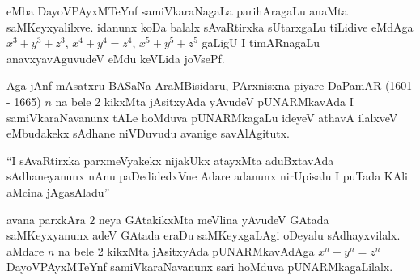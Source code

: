 eMba DayoVPAyxMTeYnf samiVkaraNagaLa parihAragaLu anaMta saMKeyxyalilxve. idanunx koDa balalx sAvaRtirxka sUtarxgaLu tiLidive eMdAga $x^3+y^3+z^3$, \quad $x^4+y^4=z^4$, \quad $x^5+y^5+z^5$ \quad gaLigU I timARnagaLu anavxyavAguvudeV eMdu keVLida joVsePf.

Aga jAnf mAsatxru BASaNa AraMBisidaru, PArxnisxna piyare DaPamAR {\rm (1601 - 1665)} $n$ na bele {\rm 2} kikxMta jAsitxyAda yAvudeV pUNARMkavAda I samiVkaraNavanunx tALe hoMduva pUNARMkagaLu ideyeV athavA ilalxveV eMbudakekx sAdhane niVDuvudu avanige savAlAgitutx.

``I sAvaRtirxka parxmeVyakekx nijakUkx atayxMta aduBxtavAda sAdhaneyanunx nAnu paDedidedxVne Adare adanunx nirUpisalu I puTada KAli aMcina jAgasAladu''

avana parxkAra $2$ neya GAtakikxMta meVlina yAvudeV GAtada saMKeyxyanunx adeV GAtada eraDu saMKeyxgaLAgi oDeyalu sAdhayxvilalx. aMdare $n$ na bele {\rm 2} kikxMta jAsitxyAda pUNARMkavAdAga \quad $x^n+y^n=z^n$ \quad DayoVPAyxMTeYnf samiVkaraNavanunx sari hoMduva pUNARMkagaLilalx.

